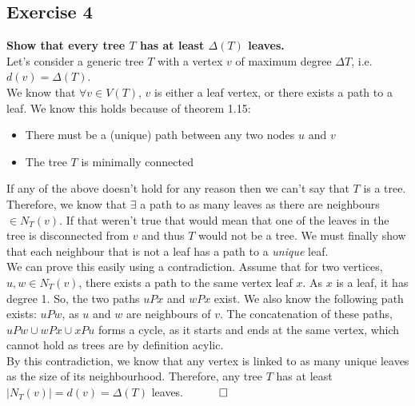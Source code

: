 \subsection*{Exercise 4}
\boldmath
\textbf{Show that every tree $T$ has at least $\Delta(T)$ leaves.}\\
\unboldmath
\linebreak
Let's consider a generic tree $T$ with a vertex $v$ of maximum degree $\Delta T$, i.e. $d(v) = \Delta(T)$. \\
\linebreak 
We know that $\forall v \in V(T)$, $v$ is either a leaf vertex, or there exists a path to a leaf. We know this holds because of theorem 1.15:
\begin{itemize}
       \item There must be a (unique) path between any two nodes $u$ and $v$
       \item The tree $T$ is minimally connected
\end{itemize}
If any of the above doesn't hold for any reason then we can't say that $T$ is a tree. 
\\
\linebreak 
Therefore, we know that $\exists$ a path to as many leaves as there are neighbours $\in N_T(v)$. If that weren't true that would mean that one of the leaves in the tree is disconnected from $v$ and thus $T$ would not be a tree. We must finally show that each neighbour that is not a leaf has a path to a \textit{unique} leaf. \\
\linebreak 
We can prove this easily using a contradiction. Assume that for two vertices, $u, w \in N_T(v)$, there exists a path to the same vertex leaf $x$. As $x$ is a leaf, it has degree 1.
\linebreak 
So, the two paths $uPx$ and $wPx$ exist. We also know the following path exists: $uPw$, as $u$ and $w$ are neighbours of $v$. The concatenation of these paths, $uPw \cup wPx \cup xPu$ forms a cycle, as it starts and ends at the same vertex, which cannot hold as trees are by definition acylic.  \\
\linebreak 
By this contradiction, we know that any vertex is linked to as many unique leaves as the size of its neighbourhood. Therefore, any tree $T$ has at least $|N_T(v)| = d(v) = \Delta(T)$ leaves. $\hspace{10mm} \square$ 